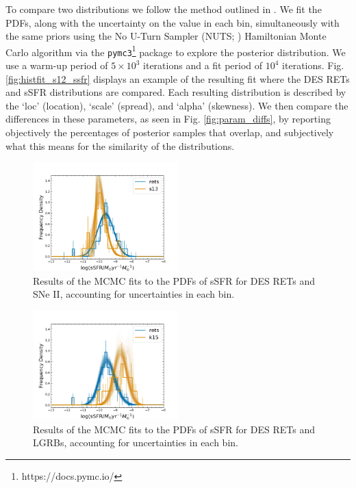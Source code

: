 \documentclass[fleqn,usenatbib,]{mnras}
\newcommand{\replychris}[1]{\color{magenta}#1 \color{black}}
\begin{document}
\replychris{To compare two distributions we follow the method outlined in \citet{Wiseman2020}. We fit the PDFs, along with the uncertainty on the value in each bin, simultaneously with the same priors using the No U-Turn Sampler (NUTS; \citealt{Hoffman2014}) Hamiltonian Monte Carlo algorithm via the  \texttt{pymc3}\footnote{https://docs.pymc.io/} package to explore the posterior distribution. We use a warm-up period of $5\times10^3$ iterations and a fit period of $10^4$ iterations. Fig. \ref{fig:histfit_s12_ssfr} displays an example of the resulting fit where the DES RETs and \citet{Sanders2012} sSFR distributions are compared. Each resulting distribution is described by the `loc' (location), `scale' (spread), and `alpha' (skewness). We then compare the differences in these parameters, as seen in Fig. \ref{fig:param_diffs}, by reporting objectively the percentages of posterior samples that overlap, and subjectively what this means for the similarity of the distributions.} 
\twocolumn
\begin{figure}
\includegraphics[width=0.5\textwidth]{mc_figs/rets_s13_histfit_ssfr_final.png}
\caption{Results of the MCMC fits to the PDFs of sSFR for DES RETs and SNe II, accounting for uncertainties in each bin.
\label{fig:histfit_ssfr_s13}}
\end{figure}
\begin{figure}
\includegraphics[width=0.5\textwidth]{mc_figs/rets_k15_histfit_ssfr_final.png}
\caption{Results of the MCMC fits to the PDFs of sSFR for DES RETs and LGRBs, accounting for uncertainties in each bin.
\label{fig:histfit_ssfr_k15}}
\end{figure}
\end{document}
